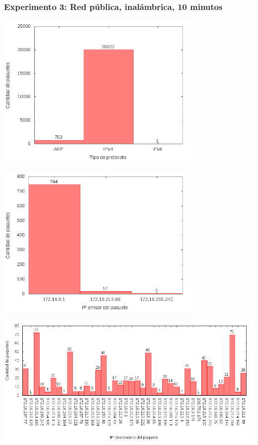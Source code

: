 \subsubsection{Experimento 3: Red pública, inalámbrica, 10 minutos}

\includegraphics[width=10cm]{../mediciones/altop-wifi-10/altop10Protocolos.png}

\includegraphics[width=10cm]{../mediciones/altop-wifi-10/altop10IpsSrcArp.png}

\includegraphics[width=16cm]{../mediciones/altop-wifi-10/altop10IpsDstArp.png}

